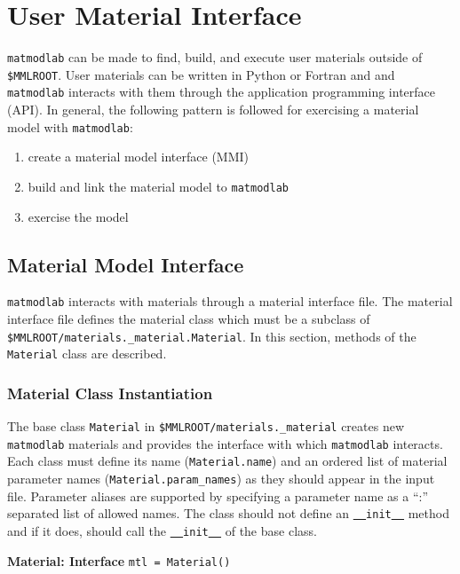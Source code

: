 \documentclass[12pt,report,strict]{SANDreport/SANDreport}
\newenvironment{interface}%
   {\par\noindent\adjustbox{margin=1ex,bgcolor=lemon,margin=0ex
       \medskipamount}\bgroup\minipage\textwidth}%
   {\endminipage\egroup}
\newcommand{\usage}[1]{\indent\hspace{2.5em}\texttt{#1}}
\newcommand{\mml}{\texttt{matmodlab}}
\newcommand{\us}{\underline{  }}
\newcommand{\uus}{\us\us{}}
\begin{document}
\chapter{User Material Interface}
\label{chap:usrmtl}
\mml{} can be made to find, build, and execute user materials outside of
\verb|$MMLROOT|.  User materials can be written in Python or Fortran and and
\mml{} interacts with them through the application programming interface
(API).  In general, the following pattern is followed for exercising a
material model with \mml{}:
%
\begin{enumerate}
  \item create a material model interface (MMI)
  \item build and link the material model to \mml{}
  \item exercise the model
\end{enumerate}
%

\section{Material Model Interface}
\label{sec:usrint}
\mml{} interacts with materials through a material interface file. The
material interface file defines the material class which must be a subclass of\\
\verb|$MMLROOT/materials._material.Material|.  In this section, methods of the
\verb|Material| class are described.

\subsection{Material Class Instantiation}
\label{sec:basecls}
The base class \verb|Material| in \verb|$MMLROOT/materials._material| creates
new \mml{} materials and provides the interface with which \mml{} interacts.
Each class must define its name (\verb|Material.name|) and an ordered list of
material parameter names (\verb|Material.param_names|) as they should appear
in the input file. Parameter aliases are supported by specifying a parameter
name as a ``:'' separated list of allowed names. The class should not define
an \texttt{\uus{}init\uus{}} method and if it does, should call the
\texttt{\uus{}init\uus{}} of the base class.

\begin{interface}
  \textbf{Material: Interface}
\end{interface}
\usage{mtl = Material()}
\end{document}
